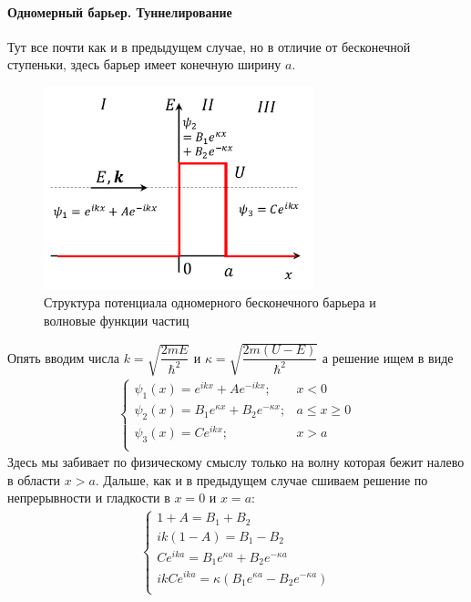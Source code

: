 \documentclass[12pt]{article}
\begin{document}
\paragraph{Одномерный барьер. Туннелирование}
Тут все почти как и в предыдущем случае, но в отличие от бесконечной ступеньки, здесь барьер имеет конечную ширину $a$. 
\begin{figure}[h]
    \centering
    \includegraphics[width=0.7\textwidth,height=\textheight,keepaspectratio]{Seminar_04/pics/pic_02.pdf}
    \caption{Структура потенциала одномерного бесконечного барьера и волновые функции частиц}
    \label{fig:sem_04}
\end{figure}
Опять вводим числа $k = \sqrt{\dfrac{2mE}{\hbar^2}}$ и $ \kappa = \sqrt{\dfrac{2m(U -E)}{\hbar^2}}$ а решение ищем в виде
\begin{gather*}
    \begin{cases}
         \psi_1(x) = e^{ikx} + A e^{-ikx}; &x<0  \\
         \psi_2(x) = B_1e^{\kappa x} + B_2e^{-\kappa x}; & a\le x\ge 0  \\
         \psi_3(x) = Ce^{ikx} ; &x>a  \\
    \end{cases}
\end{gather*}
Здесь мы забивает по физическому смыслу только на волну которая бежит налево в области $x>a$. Дальше, как и в предыдущем случае сшиваем решение по непрерывности и гладкости в $x=0$ и $x=a$:
\begin{gather*}
    \begin{cases}
         1+A = B_1+B_2  \\
         ik(1-A) = B_1-B_2 \\
         Ce^{ika} = B_1e^{\kappa a} + B_2e^{-\kappa a}\\
         ikCe^{ika} = \kappa (B_1e^{\kappa a} - B_2e^{-\kappa a})\\
    \end{cases}
\end{gather*}
\end{document}
